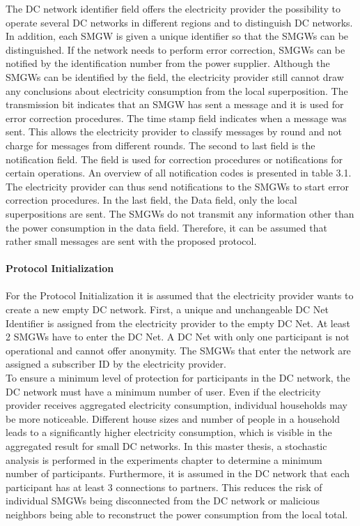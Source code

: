 The DC network identifier field offers the electricity provider the possibility to operate several DC networks in different regions and to distinguish DC networks. In addition, each SMGW is given a unique identifier so that the SMGWs can be distinguished. If the network needs to perform error correction, SMGWs can be notified by the identification number from the power supplier. Although the SMGWs can be identified by the field, the electricity provider still cannot draw any conclusions about electricity consumption from the local superposition. The transmission bit indicates that an SMGW has sent a message and it is used for error correction procedures. The time stamp field indicates when a message was sent. This allows the electricity provider to classify messages by round and not charge for messages from different rounds. The second to last field is the notification field. The field is used for correction procedures or notifications for certain operations. An overview of all notification codes is presented in table 3.1. The electricity provider can thus send notifications to the SMGWs to start error correction procedures. In the last field, the Data field, only the local superpositions are sent. The SMGWs do not transmit any information other than the power consumption in the data field. Therefore, it can be assumed that rather small messages are sent with the proposed protocol.\\
\\
\textbf{Protocol Initialization}
\\
\\
For the Protocol Initialization it is assumed that the electricity provider wants to create a new empty DC network. First, a unique and unchangeable DC Net Identifier is assigned from the electricity provider to the empty DC Net. At least 2 SMGWs have to enter the DC Net. A DC Net with only one participant is not operational and cannot offer anonymity. 
The SMGWs that enter the network are assigned a subscriber ID by the electricity provider.\\
To ensure a minimum level of protection for participants in the DC network, the DC network must have a minimum number of user. Even if the electricity provider receives aggregated electricity consumption, individual households may be more noticeable. Different house sizes and number of people in a household leads to a significantly higher electricity consumption, which is visible in the aggregated result for small DC networks. In this master thesis, a stochastic analysis is performed in the experiments chapter to determine a minimum number of participants. Furthermore, it is assumed in the DC network that each participant has at least 3 connections to partners. This reduces the risk of individual SMGWs being disconnected from the DC network or malicious neighbors being able to reconstruct the power consumption from the local total.\\
